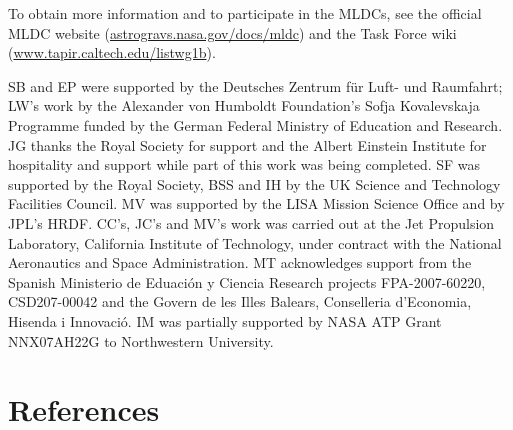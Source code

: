 \documentclass{iopart}
\begin{document}
To obtain more information and to participate in the MLDCs, see the official MLDC website (\url{astrogravs.nasa.gov/docs/mldc}) and the Task Force wiki (\url{www.tapir.caltech.edu/listwg1b}).

\ack

SB and EP were supported by the Deutsches Zentrum f\"ur Luft- und Raumfahrt; LW's work by the Alexander von Humboldt Foundation's Sofja Kovalevskaja Programme funded by the German Federal Ministry of Education and Research. %
JG thanks the Royal Society for support and the Albert Einstein
Institute for hospitality and support while part of this work was
being completed. %
SF was supported by the Royal Society, BSS and IH by the UK Science and Technology Facilities Council. %
MV was supported by the LISA Mission Science Office and by JPL's HRDF.
CC's, JC's and MV's work was carried out at the Jet Propulsion Laboratory, California Institute of Technology, under contract with the National Aeronautics and Space Administration. %
MT acknowledges support from the Spanish Ministerio de Eduaci\'on y
Ciencia Research projects FPA-2007-60220, CSD207-00042 and the Govern
de les Illes Balears, Conselleria d'Economia, Hisenda i Innovaci\'o. %
IM was partially supported by NASA ATP Grant NNX07AH22G to Northwestern University. %

\section*{References}
\end{document}
